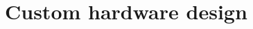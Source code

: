 \documentclass[12pt]{report}
\begin{document}






\chapter{Custom hardware design}
\end{document}
